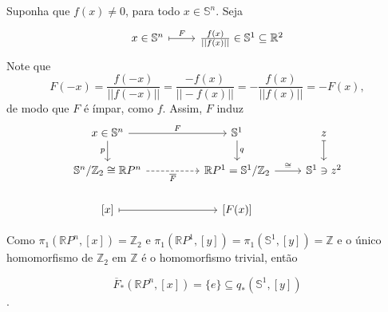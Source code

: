 \begin{dem}
    Suponha que $f(x) \neq 0$, para todo $x \in \mathbb{S}^n$. Seja 
    \[\begin{tikzcd}
    x \in \mathbb{S}^n \arrow[r, "F", maps to] & \frac{f(x)}{||f(x)||} \in \mathbb{S}^1 \subseteq \mathbb{R}^2
    \end{tikzcd}\]
    Note que 
    $$ F(-x) = \frac{f(-x)}{||f(-x)||} = \frac{-f(x)}{||-f(x)||} = -\frac{f(x)}{||f(x)||} = -F(x), $$
    de modo que $F$ é ímpar, como $f$. Assim, $F$ induz
    \[\begin{tikzcd}
    x \in \mathbb{S}^n \arrow[rr, "F"] \arrow[d, "p"']                                  &  &    \mathbb{S}^1 \arrow[d, "q"]                                    & z \arrow[d, maps to] \\
    \mathbb{S}^n / \mathbb{Z}_2 \cong \mathbb{R}P^n \arrow[rr, "\overline{F}"', dashed] &  & \mathbb{R}P^1 = \mathbb{S}^1 / \mathbb{Z}_2 \arrow[r, "\cong"] & \mathbb{S}^1 \ni z^2 \\
    {[x]} \arrow[rr, maps to]                                                           &  & {[F(x)]}                                                       &                     
    \end{tikzcd}\]

    Como  \hyperref[grupo-fundamental-de-espaco-projetivo-ex]{$\pi_1(\mathbb{R}P^n, [x]) = \mathbb{Z}_2$} e \hyperref[grupo-fundamental-de-S1-prop]{$\pi_1(\mathbb{R}P^1, [y]) = \pi_1(\mathbb{S}^1, [y]) = \mathbb{Z}$} e o único homomorfismo de $\mathbb{Z}_2$ em $\mathbb{Z}$ é o homomorfismo trivial, então 
    
    $$\overline{F}_{*}(\mathbb{R}P^n, [x]) = \{e\} \subseteq q_{*}(\mathbb{S}^1, [y]) $$.


\end{dem}
